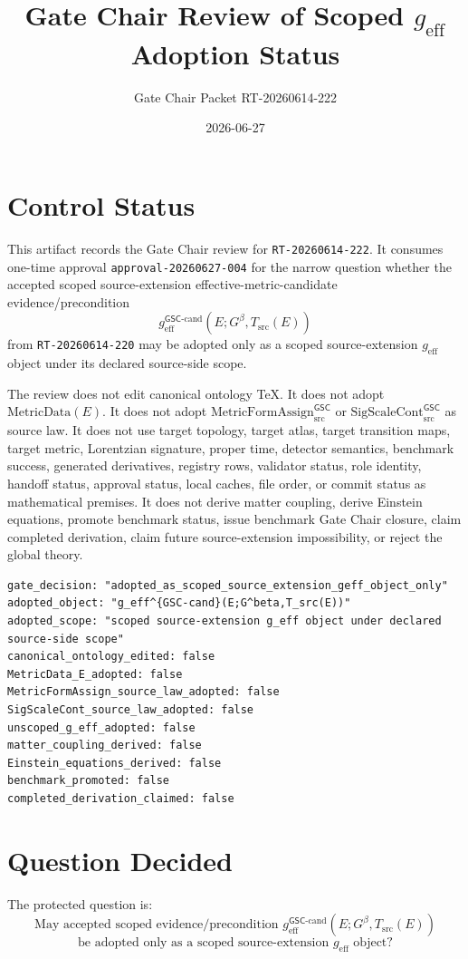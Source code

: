 \documentclass[11pt]{article}
\title{Gate Chair Review of Scoped \texorpdfstring{$g_{\mathrm{eff}}$}{g_eff} Adoption Status}
\author{Gate Chair Packet RT-20260614-222}
\date{2026-06-27}
\newcommand{\Gbeta}{G^\beta}
\newcommand{\SigScaleCont}{\mathrm{SigScaleCont}^{\mathsf{GSC}}_{\mathrm{src}}}
\newcommand{\MetricFormAssign}{\mathrm{MetricFormAssign}^{\mathsf{GSC}}_{\mathrm{src}}}
\newcommand{\geff}{g_{\mathrm{eff}}}
\newcommand{\geffCand}{g_{\mathrm{eff}}^{\mathsf{GSC}\mbox{-}\mathrm{cand}}}
\begin{document}
\maketitle

\section{Control Status}

This artifact records the Gate Chair review for \texttt{RT-20260614-222}. It
consumes one-time approval \texttt{approval-20260627-004} for the narrow
question whether the accepted scoped source-extension effective-metric-candidate
evidence/precondition
\[
  \geffCand(E;\Gbeta,T_{\mathrm{src}}(E))
\]
from \texttt{RT-20260614-220} may be adopted only as a scoped source-extension
\(\geff\) object under its declared source-side scope.

The review does not edit canonical ontology TeX. It does not adopt
\(\mathrm{MetricData}(E)\). It does not adopt \(\MetricFormAssign\) or
\(\SigScaleCont\) as source law. It does not use target topology, target
atlas, target transition maps, target metric, Lorentzian signature, proper
time, detector semantics, benchmark success, generated derivatives, registry
rows, validator status, role identity, handoff status, approval status, local
caches, file order, or commit status as mathematical premises. It does not
derive matter coupling, derive Einstein equations, promote benchmark status,
issue benchmark Gate Chair closure, claim completed derivation, claim future
source-extension impossibility, or reject the global theory.

\begin{verbatim}
gate_decision: "adopted_as_scoped_source_extension_geff_object_only"
adopted_object: "g_eff^{GSC-cand}(E;G^beta,T_src(E))"
adopted_scope: "scoped source-extension g_eff object under declared source-side scope"
canonical_ontology_edited: false
MetricData_E_adopted: false
MetricFormAssign_source_law_adopted: false
SigScaleCont_source_law_adopted: false
unscoped_g_eff_adopted: false
matter_coupling_derived: false
Einstein_equations_derived: false
benchmark_promoted: false
completed_derivation_claimed: false
\end{verbatim}

\section{Question Decided}

The protected question is:
\[
\text{May accepted scoped evidence/precondition }\geffCand(E;\Gbeta,T_{\mathrm{src}}(E))
\]
\[
\text{be adopted only as a scoped source-extension }\geff\text{ object?}
\]
\end{document}
